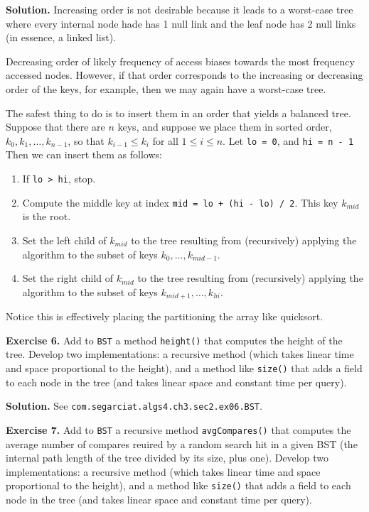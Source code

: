 \documentclass[12pt, a4paper]{article}
\newenvironment{ex}[2][Exercise]
{\par\medskip\noindent \textbf{#1 #2.}}
{\medskip}
\newenvironment{sol}[1][Solution]
{\par\medskip\noindent \textbf{#1.} }
{\medskip}
\begin{document}
	\begin{sol}
		Increasing order is not desirable because it leads to a worst-case tree where
		every internal node hade has 1 null link and the leaf node has 2 null links
		(in essence, a linked list).
		
		Decreasing order of likely frequency of access biases towards the most frequency
		accessed nodes. However, if that order corresponds to the increasing or decreasing
		order of the keys, for example, then we may again have a worst-case tree.
		
		The safest thing to do is to insert them in an order that yields a balanced tree.
		Suppose that there are $n$ keys, and suppose we place them in sorted order,
		$k_0,k_1,\ldots,k_{n-1}$, so that $k_{i-1} \leq k_{i}$ for all $1\leq i\leq n$.
		Let \texttt{lo = 0}, and \texttt{hi = n - 1}
		Then we can insert them as follows:
		\begin{enumerate}[label=(\roman*)]
			\item If \texttt{lo > hi}, stop.
			\item Compute the middle key at index \texttt{mid = lo + (hi - lo) / 2}.
			This key $k_{mid}$ is the root.
			\item Set the left child of $k_{mid}$ to the tree resulting from (recursively) applying
			the algorithm to the subset of keys $k_0,\ldots,k_{mid-1}$.
			\item Set the right child of $k_{mid}$ to the tree resulting from (recursively) applying
			the algorithm to the subset of keys $k_{mid+1},\ldots,k_{hi}$.
		\end{enumerate}
		Notice this is effectively placing the partitioning the array like quicksort.
	\end{sol}
	\begin{ex}{6}
		Add to \texttt{BST} a method \texttt{height()} that computes the height of the tree.
		Develop two implementations: a recursive method (which takes linear time and space
		proportional to the height), and a method like \texttt{size()} that adds a field to
		each node in the tree (and takes linear space and constant time per query).
	\end{ex}
	\begin{sol}
		See \texttt{com.segarciat.algs4.ch3.sec2.ex06.BST}.
	\end{sol}
	\begin{ex}{7}
		Add to \texttt{BST} a recursive method \texttt{avgCompares()} that computes the average
		number of compares reuired by a random search hit in a given BST (the internal path length
		of the tree divided by its size, plus one). Develop two implementations: a recursive method
		(which takes linear time and space proportional to the height), and a method like
		\texttt{size()} that adds a field to each node in the tree (and takes linear space and
		constant time per query).
	\end{ex}
\end{document}
